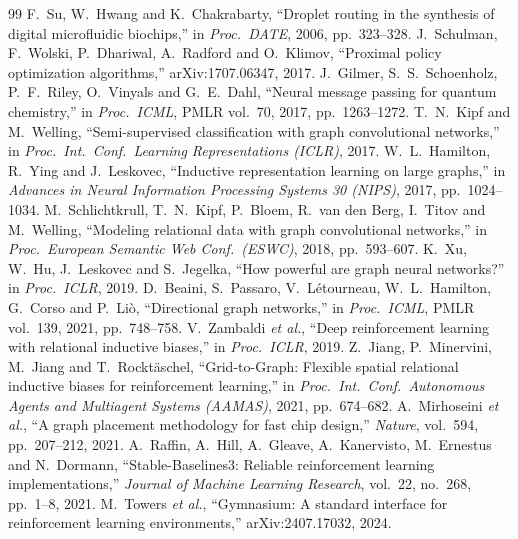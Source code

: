 \documentclass[11pt,a4paper]{article}
\begin{document}
\begin{thebibliography}{99}
 F.~Su, W.~Hwang and K.~Chakrabarty, ``Droplet routing in the synthesis of digital microfluidic biochips,'' in \emph{Proc.\ DATE}, 2006, pp.~323--328.
 J.~Schulman, F.~Wolski, P.~Dhariwal, A.~Radford and O.~Klimov, ``Proximal policy optimization algorithms,'' arXiv:1707.06347, 2017.
 J.~Gilmer, S.~S.~Schoenholz, P.~F.~Riley, O.~Vinyals and G.~E.~Dahl, ``Neural message passing for quantum chemistry,'' in \emph{Proc.\ ICML}, PMLR vol.~70, 2017, pp.~1263--1272.
 T.~N.~Kipf and M.~Welling, ``Semi-supervised classification with graph convolutional networks,'' in \emph{Proc.\ Int.\ Conf.\ Learning Representations (ICLR)}, 2017.
 W.~L.~Hamilton, R.~Ying and J.~Leskovec, ``Inductive representation learning on large graphs,'' in \emph{Advances in Neural Information Processing Systems 30 (NIPS)}, 2017, pp.~1024--1034.
 M.~Schlichtkrull, T.~N.~Kipf, P.~Bloem, R.~van den Berg, I.~Titov and M.~Welling, ``Modeling relational data with graph convolutional networks,'' in \emph{Proc.\ European Semantic Web Conf.\ (ESWC)}, 2018, pp.~593--607.
 K.~Xu, W.~Hu, J.~Leskovec and S.~Jegelka, ``How powerful are graph neural networks?'' in \emph{Proc.\ ICLR}, 2019.
 D.~Beaini, S.~Passaro, V.~L{\'e}tourneau, W.~L.~Hamilton, G.~Corso and P.~Li{\`o}, ``Directional graph networks,'' in \emph{Proc.\ ICML}, PMLR vol.~139, 2021, pp.~748--758.
 V.~Zambaldi \emph{et al.}, ``Deep reinforcement learning with relational inductive biases,'' in \emph{Proc.\ ICLR}, 2019.
 Z.~Jiang, P.~Minervini, M.~Jiang and T.~Rockt{\"a}schel, ``Grid-to-Graph: Flexible spatial relational inductive biases for reinforcement learning,'' in \emph{Proc.\ Int.\ Conf.\ Autonomous Agents and Multiagent Systems (AAMAS)}, 2021, pp.~674--682.
 A.~Mirhoseini \emph{et al.}, ``A graph placement methodology for fast chip design,'' \emph{Nature}, vol.~594, pp.~207--212, 2021.
 A.~Raffin, A.~Hill, A.~Gleave, A.~Kanervisto, M.~Ernestus and N.~Dormann, ``Stable-Baselines3: Reliable reinforcement learning implementations,'' \emph{Journal of Machine Learning Research}, vol.~22, no.~268, pp.~1--8, 2021.
 M.~Towers \emph{et al.}, ``Gymnasium: A standard interface for reinforcement learning environments,'' arXiv:2407.17032, 2024.
\end{thebibliography}
\end{document}
